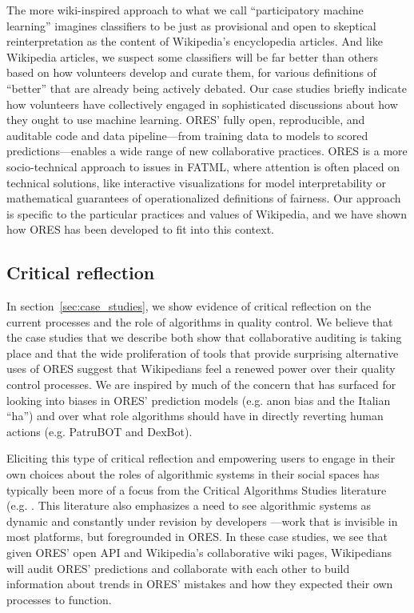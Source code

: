 The more wiki-inspired approach to what we call ``participatory machine learning'' imagines classifiers to be just as provisional and open to skeptical reinterpretation as the content of Wikipedia's encyclopedia articles. And like Wikipedia articles, we suspect some classifiers will be far better than others based on how volunteers develop and curate them, for various definitions of ``better'' that are already being actively debated. Our case studies briefly indicate how volunteers have collectively engaged in sophisticated discussions about how they ought to use machine learning. ORES' fully open, reproducible, and auditable code and data pipeline---from training data to models to scored predictions---enables a wide range of new collaborative practices. ORES is a more socio-technical approach to issues in FATML, where attention is often placed on technical solutions, like interactive visualizations for model interpretability or mathematical guarantees of operationalized definitions of fairness. Our approach is specific to the particular practices and values of Wikipedia, and we have shown how ORES has been developed to fit into this context.

\subsection{Critical reflection}
In section~\ref{sec:case_studies}, we show evidence of critical reflection on the current processes and the role of algorithms in quality control.  We believe that the case studies that we describe both show that collaborative auditing is taking place and that the wide proliferation of tools that provide surprising alternative uses of ORES suggest that Wikipedians feel a renewed power over their quality control processes.  We are inspired by much of the concern that has surfaced for looking into biases in ORES' prediction models (e.g. anon bias and the Italian ``ha'') and over what role algorithms should have in directly reverting human actions (e.g. PatruBOT and DexBot).

Eliciting this type of critical reflection and empowering users to engage in their own choices about the roles of algorithmic systems in their social spaces has typically been more of a focus from the Critical Algorithms Studies literature (e.g. \cite{barocas2013governing, kitchin2017thinking}. This literature also emphasizes a need to see algorithmic systems as dynamic and constantly under revision by developers \cite{seaver2017algorithms}---work that is invisible in most platforms, but foregrounded in ORES. In these case studies, we see that given ORES' open API and Wikipedia's collaborative wiki pages, Wikipedians will audit ORES' predictions and collaborate with each other to build information about trends in ORES' mistakes and how they expected their own processes to function.

